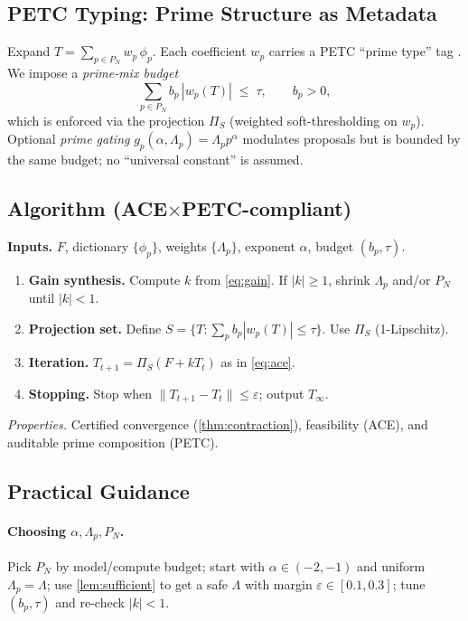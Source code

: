 \documentclass[11pt]{article}
\theoremstyle{plain}
\theoremstyle{definition}
\theoremstyle{remark}
\begin{document}
\subsection{PETC Typing: Prime Structure as Metadata}
Expand $T=\sum_{p\in P_N} w_p\,\phi_p$. Each coefficient $w_p$ carries a PETC ``prime type'' tag \cite{VanGelderPETC}. We impose a \emph{prime-mix budget}
\begin{equation}
  \sum_{p\in P_N} b_p\,|w_p(T)| \;\le\; \tau,\qquad b_p>0,
  \label{eq:budget}
\end{equation}
which is enforced via the projection $\Pi_S$ (weighted soft-thresholding on $w_p$). Optional \emph{prime gating} $g_p(\alpha,\Lambda_p)=\Lambda_p p^{\alpha}$ modulates proposals but is bounded by the same budget; no ``universal constant'' is assumed.

\subsection{Algorithm (ACE$\times$PETC-compliant)}
\noindent\textbf{Inputs.} $F$, dictionary $\{\phi_p\}$, weights $\{\Lambda_p\}$, exponent $\alpha$, budget $(b_p,\tau)$.

\begin{enumerate}[leftmargin=2em,label=\arabic*.]
  \item \textbf{Gain synthesis.} Compute $k$ from \cref{eq:gain}. If $|k|\ge 1$, shrink $\Lambda_p$ and/or $P_N$ until $|k|<1$.
  \item \textbf{Projection set.} Define $S=\{T:\sum_p b_p|w_p(T)|\le \tau\}$. Use $\Pi_S$ (1-Lipschitz).
  \item \textbf{Iteration.} $T_{t+1}=\Pi_S(F+kT_t)$ as in \cref{eq:ace}.
  \item \textbf{Stopping.} Stop when $\|T_{t+1}-T_t\|\le\varepsilon$; output $T_\infty$.
\end{enumerate}
\noindent\emph{Properties.} Certified convergence (\cref{thm:contraction}), feasibility (ACE), and auditable prime composition (PETC).

\subsection{Practical Guidance}
\paragraph{Choosing $\alpha,\Lambda_p,P_N$.} Pick $P_N$ by model/compute budget; start with $\alpha\in(-2,-1)$ and uniform $\Lambda_p=\Lambda$; use \cref{lem:sufficient} to get a safe $\Lambda$ with margin $\varepsilon\in[0.1,0.3]$; tune $(b_p,\tau)$ and re-check $|k|<1$.
\end{document}
